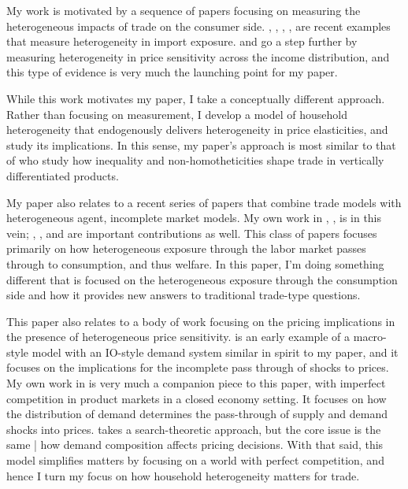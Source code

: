 \documentclass[12pt,pdftex]{article}
\begin{document}
\begin{onehalfspacing}
My work is motivated by a sequence of papers focusing on measuring the heterogeneous impacts of trade on the consumer side. \citet{fajgelbaum2016measuring}, \citet{cravino2017distributional}, \citet{carroll2020heterogeneous}, \citet{borusyak2021distributional}, \citet{jaccardtoronto} are recent examples that measure heterogeneity in import exposure. \citet{auer2022unequal} and \citet{colicev2022impact} go a step further by measuring heterogeneity in price sensitivity across the income distribution, and this type of evidence is very much the launching point for my paper.

While this work motivates my paper, I take a conceptually different approach. Rather than focusing on measurement, I develop a model of household heterogeneity that endogenously delivers heterogeneity in price elasticities, and study its implications. In this sense, my paper's approach is most similar to that of \citet{fajgelbaum2011income} who study how inequality and non-homotheticities shape trade in vertically differentiated products.

My paper also relates to a recent series of papers that combine trade models with heterogeneous agent, incomplete market models. My own work in \citet{lyon2018redistributing}, \citet{lyon2019}, \citet{waugh_consumption} is in this vein; \citet{gaston2018}, \citet{carroll2020heterogeneous}, and \citet{dvorkin2023heterogeneous} are important contributions as well. This class of papers focuses primarily on how heterogeneous exposure through the labor market passes through to consumption, and thus welfare. In this paper, I'm doing something different that is focused on the heterogeneous exposure through the consumption side and how it provides new answers to traditional trade-type questions.

This paper also relates to a body of work focusing on the pricing implications in the presence of heterogeneous price sensitivity. \citet{nakamura2010accounting} is an early example of a macro-style model with an IO-style demand system similar in spirit to my paper, and it focuses on the implications for the incomplete pass through of shocks to prices. My own work in \citet{p-iq} is very much a companion piece to this paper, with imperfect competition in product markets in a closed economy setting. It focuses on how the distribution of demand determines the pass-through of supply and demand shocks into prices.  \citet{nord2022shopping} takes a search-theoretic approach, but the core issue is the same | how demand composition affects pricing decisions. With that said, this model simplifies matters by focusing on a world with perfect competition, and hence I turn my focus on how household heterogeneity matters for trade.


\end{onehalfspacing}
\end{document}
